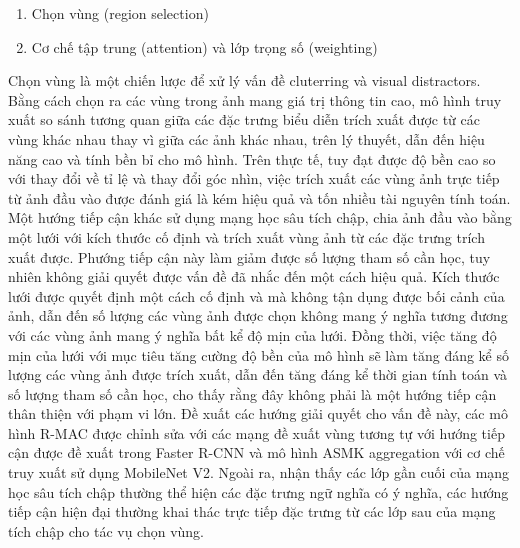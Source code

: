 \begin{enumerate}
    \item Chọn vùng (region selection)
    \item Cơ chế tập trung (attention) và lớp trọng số (weighting)
\end{enumerate}

Chọn vùng là một chiến lược để xử lý vấn đề cluterring và visual distractors. Bằng cách chọn ra các vùng trong ảnh mang giá trị thông tin cao, mô hình truy xuất so sánh tương quan giữa các đặc trưng biểu diễn trích xuất được từ các vùng khác nhau thay vì giữa các ảnh khác nhau, trên lý thuyết, dẫn đến hiệu năng cao và tính bền bỉ cho mô hình. Trên thực tế, tuy đạt được độ bền cao so với thay đổi về tỉ lệ và thay đổi góc nhìn, việc trích xuất các vùng ảnh trực tiếp từ ảnh đầu vào được đánh giá là kém hiệu quả và tốn nhiều tài nguyên tính toán. Một hướng tiếp cận khác sử dụng mạng học sâu tích chập, chia ảnh đầu vào bằng một lưới với kích thước cố định và trích xuất vùng ảnh từ các đặc trưng trích xuất được\cite{razavian2016visual, tolias2015particular}. Phướng tiếp cận này làm giảm được số lượng tham số cần học, tuy nhiên không giải quyết được vấn đề đã nhắc đến một cách hiệu quả. Kích thước lưới được quyết định một cách cố định và mà không tận dụng được bối cảnh của ảnh, dẫn đến số lượng các vùng ảnh được chọn không mang ý nghĩa tương đương với các vùng ảnh mang ý nghĩa bất kể độ mịn của lưới. Đồng thời, việc tăng độ mịn của lưới với mục tiêu tăng cường độ bền của mô hình sẽ làm tăng đáng kể số lượng các vùng ảnh được trích xuất, dẫn đến tăng đáng kể thời gian tính toán và số lượng tham số cần học, cho thấy rằng đây không phải là một hướng tiếp cận thân thiện với phạm vi lớn. Đề xuất các hướng giải quyết cho vấn đề này, các mô hình R-MAC\cite{tolias2015particular} được chỉnh sửa với các mạng đề xuất vùng tương tự với hướng tiếp cận được đề xuất trong Faster R-CNN\cite{ren2015faster} và mô hình ASMK aggregation\cite{selective-match-kernel} với cơ chế truy xuất sử dụng MobileNet V2\cite{sandler2018mobilenetv2, teichmann2019detect}. Ngoài ra, nhận thấy các lớp gần cuối của mạng học sâu tích chập thường thể hiện các đặc trưng ngữ nghĩa có ý nghĩa\cite{ZeilerVisualizingAU}, các hướng tiếp cận hiện đại thường khai thác trực tiếp đặc trưng từ các lớp sau của mạng tích chập cho tác vụ chọn vùng\cite{chen2017only, khaliq2019holistic}.

